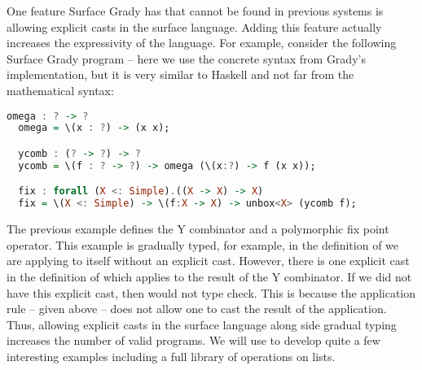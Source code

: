 One feature Surface Grady has that cannot be found in previous systems
is allowing explicit casts in the surface language.  Adding this
feature actually increases the expressivity of the language.  For
example, consider the following Surface Grady program -- here we use
the concrete syntax from Grady's implementation, but it is very
similar to Haskell and not far from the mathematical syntax:
\begin{lstlisting}[language=Haskell]
  omega : ? -> ?
  omega = \(x : ?) -> (x x);

  ycomb : (? -> ?) -> ?
  ycomb = \(f : ? -> ?) -> omega (\(x:?) -> f (x x));

  fix : forall (X <: Simple).((X -> X) -> X)
  fix = \(X <: Simple) -> \(f:X -> X) -> unbox<X> (ycomb f);
\end{lstlisting}
The previous example defines the Y combinator and a polymorphic fix
point operator.  This example is gradually typed, for example, in the
definition of  we are applying  to itself
without an explicit cast.  However, there is one explicit cast in the
definition of  which applies  to the
result of the Y combinator.  If we did not have this explicit cast,
then  would not type check.  This is because the
application rule -- given above -- does not allow one to cast the
result of the application.  Thus, allowing explicit casts in the
surface language along side gradual typing increases the number of
valid programs.  We will use  to develop quite a few
interesting examples including a full library of operations on lists.

